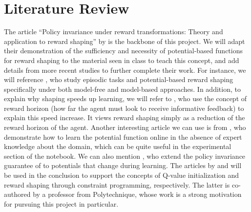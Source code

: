 \documentclass{article}
\begin{document}
\section*{Literature Review}

The article ``Policy invariance under reward transformations: Theory and application to reward shaping'' by \citet{ng1999} is the backbone of this project. We will adapt their demonstration of the sufficiency and necessity of potential-based functions for reward shaping to the material seen in class to teach this concept, and add details from more recent studies to further complete their work. For instance, we will reference \citet{grzes2017}, who study episodic tasks and potential-based reward shaping specifically under both model-free and model-based approaches. In addition, to explain why shaping speeds up learning, we will refer to \citet{laud2003}, who use the concept of reward horizon (how far the agent must look to receive informative feedback) to explain this speed increase. It views reward shaping simply as a reduction of the reward horizon of the agent. Another interesting article we can use is from \citet{grzes2010}, who demonstrate how to learn the potential function online in the absence of expert knowledge about the domain, which can be quite useful in the experimental section of the notebook. We can also mention \citet{devlin2012}, who extend the policy invariance guarantee of \citet{ng1999} to potentials that change during learning. The articles by \citet{wiewiora2003} and \citet{yin2025} will be used in the conclusion to support the concepts of Q-value initialization and reward shaping through constraint programming, respectively. The latter is co-authored by a professor from Polytechnique, whose work is a strong motivation for pursuing this project in particular.



\end{document}
